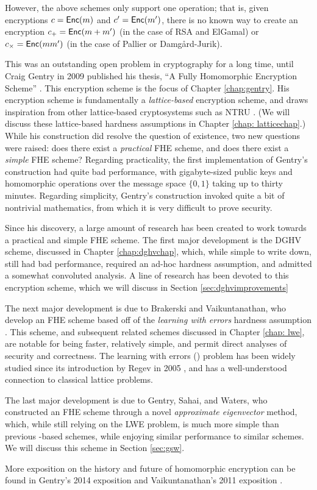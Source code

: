 However, the above schemes only support one operation; that is, given encryptions $c = {\sf Enc}(m)$ and $c' = {\sf Enc}(m')$, there is no known way to create an encryption $c_+ = {\sf Enc}(m + m')$ (in the case of RSA and ElGamal) or $c_\times = {\sf Enc}(mm')$ (in the case of Pallier or Damg\aa rd-Jurik).

This was an outstanding open problem in cryptography for a long time, until Craig Gentry in 2009 published his thesis, ``A Fully Homomorphic Encryption Scheme'' \cite{gentry2009fully}. This encryption scheme is the focus of Chapter \ref{chap:gentry}. His encryption scheme is fundamentally a \emph{lattice-based} encryption scheme, and draws inspiration from other lattice-based cryptosystems such as NTRU \cite{1998ntru}. (We will discuss these lattice-based hardness assumptions in Chapter \ref{chap: latticechap}.) While his construction did resolve the question of existence, two new questions were raised: does there exist a \emph{practical} FHE scheme, and does there exist a \emph{simple} FHE scheme? Regarding practicality, the first implementation of Gentry's construction had quite bad performance, with gigabyte-sized public keys and homomorphic operations over the message space $\{0,1\}$ taking up to thirty minutes. Regarding simplicity, Gentry's construction invoked quite a bit of nontrivial mathematics, from which it is very difficult to prove security.

Since his discovery, a large amount of research has been created to work towards a practical and simple FHE scheme. The first major development is the DGHV scheme, discussed in Chapter \ref{chap:dghvchap}, which, while simple to write down, still had bad performance, required an ad-hoc hardness assumption, and admitted a somewhat convoluted analysis. A line of research has been devoted to this encryption scheme, which we will discuss in Section  \ref{sec:dghvimprovements}

The next major development is due to Brakerski and Vaikuntanathan, who develop an FHE scheme based off of the \emph{learning with errors} hardness assumption \cite{bv2011}. This scheme, and subsequent related schemes discussed in Chapter \ref{chap: lwe}, are notable for being faster, relatively simple, and permit direct analyses of security and correctness. The learning with errors (\LWE) problem has been widely studied since its introduction by Regev in 2005 \cite{regev2005}, and has a well-understood connection to classical lattice problems.

The last major development is due to Gentry, Sahai, and Waters, who constructed an FHE scheme through a novel \emph{approximate eigenvector} method, which, while still relying on the LWE problem, is much more simple than previous \LWE-based schemes, while enjoying similar performance to similar schemes. We will discuss this scheme in Section \ref{sec:gsw}.

More exposition on the history and future of homomorphic encryption can be found in Gentry's 2014 exposition \cite{chaosgentry} and Vaikuntanathan's 2011 exposition \cite{vaikuntanathan2011computing}.

